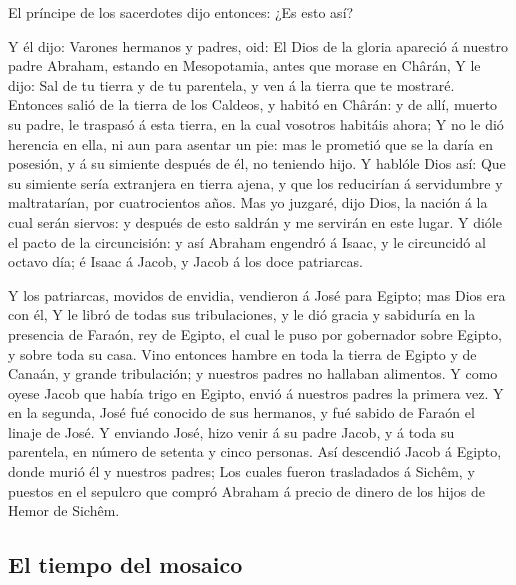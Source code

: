  El príncipe de los sacerdotes dijo entonces: ¿Es esto
así?

 Y él dijo: Varones hermanos y padres, oid: El Dios de la
gloria apareció á nuestro padre Abraham, estando en Mesopotamia, antes
que morase en Chârán,  Y le dijo: Sal de tu tierra y de tu
parentela, y ven á la tierra que te mostraré.  Entonces
salió de la tierra de los Caldeos, y habitó en Chârán: y de allí, muerto
su padre, le traspasó á esta tierra, en la cual vosotros habitáis ahora;
 Y no le dió herencia en ella, ni aun para asentar un pie:
mas le prometió que se la daría en posesión, y á su simiente después de
él, no teniendo hijo.  Y hablóle Dios así: Que su simiente
sería extranjera en tierra ajena, y que los reducirían á servidumbre y
maltratarían, por cuatrocientos años.  Mas yo juzgaré,
dijo Dios, la nación á la cual serán siervos: y después de esto saldrán
y me servirán en este lugar.  Y dióle el pacto de la
circuncisión: y así Abraham engendró á Isaac, y le circuncidó al octavo
día; é Isaac á Jacob, y Jacob á los doce patriarcas.

 Y los patriarcas, movidos de envidia, vendieron á José
para Egipto; mas Dios era con él,  Y le libró de todas
sus tribulaciones, y le dió gracia y sabiduría en la presencia de
Faraón, rey de Egipto, el cual le puso por gobernador sobre Egipto, y
sobre toda su casa.  Vino entonces hambre en toda la
tierra de Egipto y de Canaán, y grande tribulación; y nuestros padres no
hallaban alimentos.  Y como oyese Jacob que había trigo
en Egipto, envió á nuestros padres la primera vez.  Y en
la segunda, José fué conocido de sus hermanos, y fué sabido de Faraón el
linaje de José.  Y enviando José, hizo venir á su padre
Jacob, y á toda su parentela, en número de setenta y cinco personas.
 Así descendió Jacob á Egipto, donde murió él y nuestros
padres;  Los cuales fueron trasladados á Sichêm, y
puestos en el sepulcro que compró Abraham á precio de dinero de los
hijos de Hemor de Sichêm.

\hypertarget{el-tiempo-del-mosaico}{%
\subsection{El tiempo del mosaico}\label{el-tiempo-del-mosaico}}

